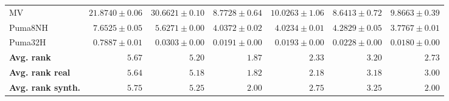 \begin{table*}[!htbp]
{\begin{tabular}{lrrrrrr}
		MV & $21.8740 \pm 0.06$ & $30.6621 \pm 0.10$ & $8.7728 \pm 0.64$ & $10.0263 \pm 1.06$ & $\mathbf{8.6413 \pm 0.72}$ & $9.8663 \pm 0.39$\\
		Puma8NH & $7.6525 \pm 0.05$ & $5.6271 \pm 0.00$ & $4.0372 \pm 0.02$ & $4.0234 \pm 0.01$ & $4.2829 \pm 0.05$ & $\mathbf{3.7767 \pm 0.01}$\\
		Puma32H & $0.7887 \pm 0.01$ & $0.0303 \pm 0.00$ & $0.0191 \pm 0.00$ & $0.0193 \pm 0.00$ & $0.0228 \pm 0.00$ & $\mathbf{0.0180 \pm 0.00}$\\
		\midrule
		\textbf{{Avg. rank}} & $5.67$ & $5.20$ & $\mathbf{1.87}$ & $2.33$ & $3.20$ & $2.73$\\
		\textbf{{Avg. rank real}} & $5.64$ & $5.18$ & $\mathbf{1.82}$ & $2.18$ & $3.18$ & $3.00$\\
		\textbf{{Avg. rank synth.}} & $5.75$ & $5.25$ & $\mathbf{2.00}$ & $2.75$ & $3.25$ & $\mathbf{2.00}$\\
		\bottomrule
	\end{tabular}}
\end{table*}

